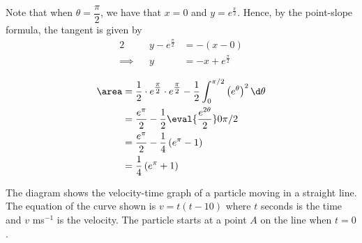 \documentclass{jhwhw}
\begin{document}
        Note that when $\theta = \dfrac\pi2$, we have that $x = 0$ and $y = e^{\tfrac\pi2}$. Hence, by the point-slope formula, the tangent is given by
        \begin{alignat*}{2}
            &&y - e^{\tfrac\pi2} &= -(x - 0)\\
            \implies&&y &= -x + e^{\tfrac\pi2}
        \end{alignat*}


        \begin{align*}
            \area &= \dfrac12 \cdot e^{\tfrac\pi2} \cdot e^{\tfrac\pi2} - \dfrac12 \int_0^{\pi/2} \left(e^\theta\right)^2 \d \theta\\
            &= \dfrac{e^\pi}2 - \dfrac12 \eval{\dfrac{e^{2\theta}}2}0{\pi/2}\\
            &= \dfrac{e^\pi}2 - \dfrac14 \left(e^\pi - 1\right)\\
            &= \dfrac14 \left(e^\pi + 1\right)
        \end{align*}

    \problem{}
        \begin{center}
        \end{center}
        The diagram shows the velocity-time graph of a particle moving in a straight line. The equation of the curve shown is $v = t(t - 10)$ where $t$ seconds is the time and $v$ ms$^{-1}$ is the velocity. The particle starts at a point $A$ on the line when $t = 0$.
\end{document}
